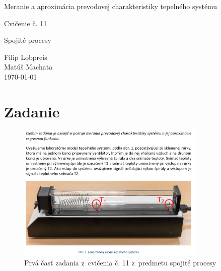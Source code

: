 \documentclass{article}
\begin{document}
\begin{titlepage}
	\null\vfill

	\begin{center}
		{\Huge Meranie a aproximácia prevodovej charakteristiky tepelného systému }
		\vskip 2cm

		{\Large Cvičenie č. 11}
		\vskip 0.5cm

		{\large Spojité procesy}
	\end{center}

	\vfill
	\vfill

	\begin{flushright}
		Filip Lobpreis \\
		Matúš Machata \\
		\small\today\\
	\end{flushright}
	\hfill
\end{titlepage}

\thispagestyle{empty}
\clearpage

\tableofcontents
\thispagestyle{empty}
\clearpage

\section{Zadanie}
\label{sec:zadanie}

\begin{figure}[!htbp]
	\begin{center}
		\includegraphics[width=0.8\textwidth]{./include/zadanie.png}
	\end{center}
	\caption{Prvá časť zadania z~cvičenia č. 11 z~predmetu spojité procesy}
	\label{fig:zadanie1}
\end{figure}

\clearpage
\end{document}
